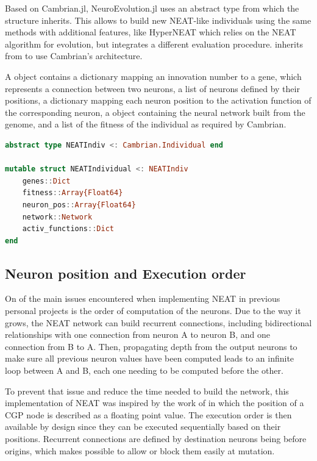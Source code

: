 Based on Cambrian.jl, NeuroEvolution.jl uses an abstract type  from which the structure  inherits. This allows to build new NEAT-like individuals using the same methods with additional features, like HyperNEAT which relies on the NEAT algorithm for evolution, but integrates a different evaluation procedure.  inherits from  to use Cambrian's architecture.

A  object contains a dictionary mapping an innovation number to a gene, which represents a connection between two neurons, a list of neurons defined by their positions, a dictionary mapping each neuron position to the activation function of the corresponding neuron, a  object containing the neural network built from the genome, and a list of the fitness of the individual as required by Cambrian.

\begin{minipage}{\linewidth}
\begin{lstlisting}[language=Julia, caption=NEAT Individual (\href{https://github.com/TemplierPaul/NeuroEvolution.jl/blob/master/src/individual.jl}{\color{blue}{Source}})]
abstract type NEATIndiv <: Cambrian.Individual end

mutable struct NEATIndividual <: NEATIndiv
    genes::Dict
    fitness::Array{Float64}
    neuron_pos::Array{Float64}
    network::Network
    activ_functions::Dict
end
\end{lstlisting}
\end{minipage}

\subsection{Neuron position and Execution order}
\label{subsec:NEAT_neur_pos}

On of the main issues encountered when implementing NEAT in previous personal projects is the order of computation of the neurons. Due to the way it grows, the NEAT network can build recurrent connections, including bidirectional relationships with one connection from neuron A to neuron B, and one connection from B to A. Then, propagating depth from the output neurons to make sure all previous neuron values have been computed leads to an infinite loop between A and B, each one needing to be computed before the other. 

To prevent that issue and reduce the time needed to build the network, this implementation of NEAT was inspired by the work of \cite{wilson2018positionalcgp} in which the position of a CGP node is described as a floating point value. The execution order is then available by design since they can be executed sequentially based on their positions. Recurrent connections are defined by destination neurons being before origins, which makes possible to allow or block them easily at mutation. 

